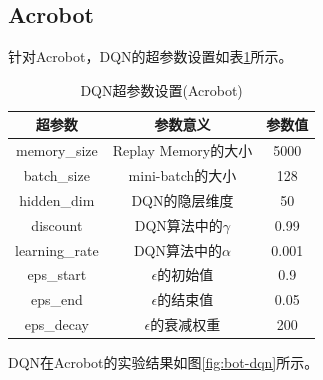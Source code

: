 \documentclass[a4paper,UTF8]{article}
\theoremstyle{definition}
\begin{document}
\subsection*{Acrobot}

针对Acrobot，DQN的超参数设置如表\ref{tab:bot-dqn}所示。

\begin{table}[H]
	\centering
	\begin{tabular}{ccc}
		\toprule
		超参数 & 参数意义 & 参数值 \\
		\midrule
		memory\_size & Replay Memory的大小 & 5000 \\
		batch\_size & mini-batch的大小 & 128 \\
		hidden\_dim & DQN的隐层维度 & 50 \\
		discount & DQN算法中的$\gamma$ & 0.99 \\
		learning\_rate & DQN算法中的$\alpha$ & 0.001 \\
		eps\_start & $\epsilon$的初始值 & 0.9 \\
		eps\_end & $\epsilon$的结束值 & 0.05 \\
		eps\_decay & $\epsilon$的衰减权重 & 200 \\
		\bottomrule
	\end{tabular}
	\caption{DQN超参数设置(Acrobot)}\label{tab:bot-dqn}
\end{table}

DQN在Acrobot的实验结果如图\ref{fig:bot-dqn}所示。
\end{document}
